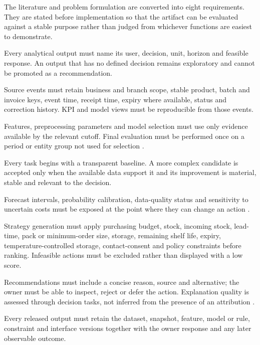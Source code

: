 The literature and problem formulation are converted into eight requirements.
They are stated before implementation so that the artifact can be evaluated
against a stable purpose rather than judged from whichever functions are easiest
to demonstrate.

\begin{description}[style=nextline,leftmargin=2em]
  \item[DR1: Decision relevance.] Every analytical output must name its user,
  decision, unit, horizon and feasible response. An output that has no defined
  decision remains exploratory and cannot be promoted as a recommendation.

  \item[DR2: Operational integrity.] Source events must retain business and
  branch scope, stable product, batch and invoice keys, event time, receipt
  time, expiry where available, status and correction history. KPI and model
  views must be reproducible from those events.

  \item[DR3: Temporal validity.] Features, preprocessing parameters and model
  selection must use only evidence available by the relevant cutoff. Final
  evaluation must be performed once on a period or entity group not used for
  selection \cite{kaufman2012leakage}.

  \item[DR4: Proportionate modelling.] Every task begins with a transparent
  baseline. A more complex candidate is accepted only when the available data
  support it and its improvement is material, stable and relevant to the
  decision.

  \item[DR5: Uncertainty and reliability.] Forecast intervals, probability
  calibration, data-quality status and sensitivity to uncertain costs must be
  exposed at the point where they can change an action
  \cite{niculescu2005calibration}.

  \item[DR6: Feasible and responsible action.] Strategy generation must apply
  purchasing budget, stock, incoming stock, lead-time, pack or minimum-order
  size, storage, remaining shelf life, expiry, temperature-controlled storage, contact-consent and
  policy constraints before ranking. Infeasible actions must be excluded rather
  than displayed with a low score.

  \item[DR7: Human authority and comprehension.] Recommendations must include a
  concise reason, source and alternative; the owner must be able to inspect,
  reject or defer the action. Explanation quality is assessed through decision
  tasks, not inferred from the presence of an attribution
  \cite{lundberg2017shap,miller2019explanation}.

  \item[DR8: Accountability and reproducibility.] Every released output must
  retain the dataset, snapshot, feature, model or rule, constraint and interface
  versions together with the owner response and any later observable outcome.
\end{description}

